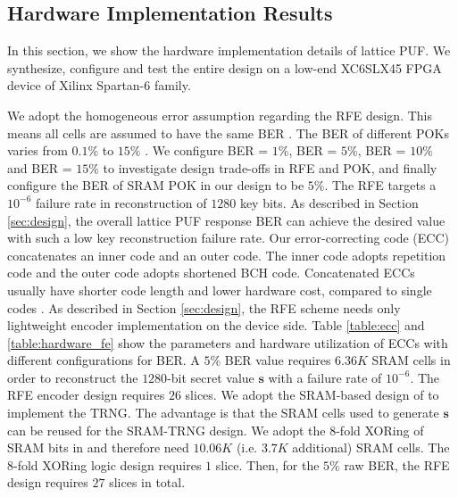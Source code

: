 \subsection{Hardware Implementation Results}
\label{sec:hardware_results}

In this section, we show the hardware implementation details of lattice PUF. We synthesize, configure and test the entire design on a low-end XC6SLX45 FPGA device of Xilinx Spartan-6 family.  

We adopt the homogeneous error assumption regarding the RFE design. This means all cells are assumed to have the same BER \cite{bosch2008efficient}.
The BER of different POKs varies from $0.1\%$ \cite{karpinskyy20168} to $15\%$ \cite{maes2009soft}.
We configure BER = $1\%$, BER = $5\%$, BER = $10\%$ and BER = $15\%$ to investigate design trade-offs in RFE and POK, and finally configure the BER of SRAM POK in our design to be $5\%$. The RFE targets a $10^{-6}$ failure rate in reconstruction of $1280$ key bits. 
As described in Section \ref{sec:design}, the overall lattice PUF response BER can achieve the desired value with such a low key reconstruction failure rate.
Our error-correcting code (ECC) concatenates an inner code and an outer code. The inner code adopts repetition code and the outer code adopts shortened BCH code. Concatenated ECCs usually have shorter code length and lower hardware cost, compared to single codes \cite{bosch2008efficient}.
As described in Section \ref{sec:design}, the RFE scheme needs only lightweight encoder implementation on the device side. 
Table \ref{table:ecc} and \ref{table:hardware_fe} show the parameters and hardware utilization of ECCs with different configurations for BER.
A $5\%$ BER value requires $6.36K$ SRAM cells in order to reconstruct the $1280$-bit secret value $\mathbf{s}$ with a failure rate of $10^{-6}$.
The RFE encoder design requires $26$ slices. 
We adopt the SRAM-based design of \cite{aysu2015end} to implement the TRNG. The advantage is that the SRAM cells used to generate $\mathbf{s}$ can be reused for the SRAM-TRNG design. 
We adopt the 8-fold XORing of SRAM bits in \cite{aysu2015end} and therefore need $10.06K$ (i.e. $3.7K$ additional) SRAM cells. 
The 8-fold XORing logic design requires $1$ slice. 
Then, for the $5\%$ raw BER, the RFE design requires $27$ slices in total. 


